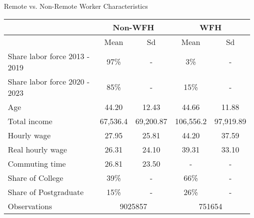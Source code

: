 \documentclass[aspectratio=1610]{beamer}
\begin{document}
\begin{frame}[label=balance]{Remote vs. Non-Remote Worker Characteristics}
\small
\begin{table}[H]
    \centering
    \begin{tabular}{lcccc}
        \hline
        \hline
     & \multicolumn{2}{c}{\textbf{Non-WFH}} & \multicolumn{2}{c}{\textbf{WFH}}\\
    \hline
     & Mean & Sd & Mean & Sd \\
    \hline 
 Share labor force 2013 - 2019 & 97\% & - & 3\% & - \\
 Share labor force 2020 - 2023 & 85\% & - & 15\% & - \\
 Age   & 44.20 & 12.43 & 44.66& 11.88  \\
 Total income  & 67,536.4 & 69,200.87 & 106,556.2 & 97,919.89 \\
 Hourly wage  & 27.95 & 25.81  & 44.20 & 37.59 \\
 Real hourly wage & 26.31 & 24.10 & 39.31 & 33.10\\
 Commuting time  & 26.81 & 23.50 & - & -   \\
 Share of College  & 39\% & - & 66\% & - \\  
 Share of Postgraduate  & 15\% & - & 26\% & - \\
    \hline
    \hline
 Observations  & \multicolumn{2}{c}{9025857} & \multicolumn{2}{c}{751654}\\ 
        \hline
        \hline
    \end{tabular}
    \label{summary_stat}
\end{table}

\end{frame}
\end{document}

